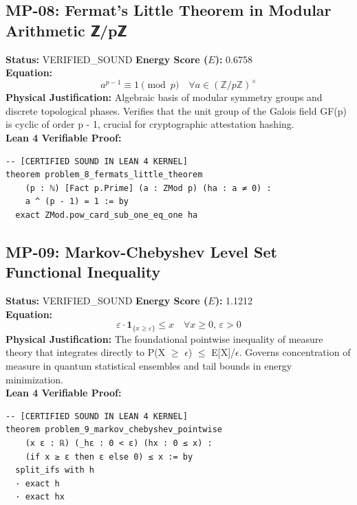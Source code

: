 \documentclass[11pt, a4paper]{article}
\begin{document}
\subsection{MP-08: Fermat's Little Theorem in Modular Arithmetic ℤ/pℤ}
\textbf{Status:} VERIFIED\_SOUND \hfill \textbf{Energy Score ($E$):} 0.6758\\
\textbf{Equation:}
\begin{equation*}
a^{p-1} \equiv 1 \pmod p \quad \forall a \in (\mathbb{Z}/p\mathbb{Z})^\times
\end{equation*}
\textbf{Physical Justification:} Algebraic basis of modular symmetry groups and discrete topological phases. Verifies that the unit group of the Galois field GF(p) is cyclic of order p - 1, crucial for cryptographic attestation hashing.\\
\textbf{Lean 4 Verifiable Proof:}
\begin{verbatim}
-- [CERTIFIED SOUND IN LEAN 4 KERNEL]
theorem problem_8_fermats_little_theorem
    (p : ℕ) [Fact p.Prime] (a : ZMod p) (ha : a ≠ 0) :
    a ^ (p - 1) = 1 := by
  exact ZMod.pow_card_sub_one_eq_one ha

\end{verbatim}

\subsection{MP-09: Markov-Chebyshev Level Set Functional Inequality}
\textbf{Status:} VERIFIED\_SOUND \hfill \textbf{Energy Score ($E$):} 1.1212\\
\textbf{Equation:}
\begin{equation*}
\varepsilon \cdot \mathbf{1}_{\{x \ge \varepsilon\}} \le x \quad \forall x \ge 0, \, \varepsilon > 0
\end{equation*}
\textbf{Physical Justification:} The foundational pointwise inequality of measure theory that integrates directly to P(X $\ge$ $\epsilon$) $\le$ E[X]/$\epsilon$. Governs concentration of measure in quantum statistical ensembles and tail bounds in energy minimization.\\
\textbf{Lean 4 Verifiable Proof:}
\begin{verbatim}
-- [CERTIFIED SOUND IN LEAN 4 KERNEL]
theorem problem_9_markov_chebyshev_pointwise
    (x ε : ℝ) (_hε : 0 < ε) (hx : 0 ≤ x) :
    (if x ≥ ε then ε else 0) ≤ x := by
  split_ifs with h
  · exact h
  · exact hx

\end{verbatim}
\end{document}
